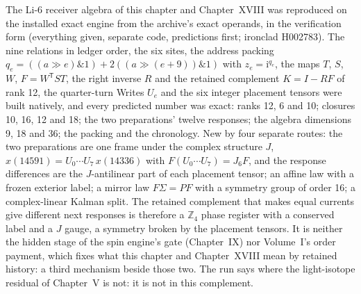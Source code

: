 The Li-6 receiver algebra of this chapter and Chapter~XVIII was reproduced on the installed exact engine from the archive's exact operands, in the verification form (everything given, separate code, predictions first; ironclad H002783).\cite{viili6run} The nine relations in ledger order, the six sites, the address packing $q_e=((a\gg e)\&1)+2((a\gg(e+9))\&1)$ with $z_e=\mathrm i^{q_e}$, the maps $T$, $S$, $W$, $F=W^{\mathsf T}ST$, the right inverse $R$ and the retained complement $K=I-RF$ of rank 12, the quarter-turn Writes $U_e$ and the six integer placement tensors were built natively, and every predicted number was exact: ranks 12, 6 and 10; closures 10, 16, 12 and 18; the two preparations' twelve responses; the algebra dimensions 9, 18 and 36; the packing and the chronology. New by four separate routes: the two preparations are one frame under the complex structure $J$, $x(14591)=U_0\cdots U_7\,x(14336)$ with $F(U_0\cdots U_7)=J_6F$, and the response differences are the $J$-antilinear part of each placement tensor; an affine law with a frozen exterior label; a mirror law $F\Sigma=PF$ with a symmetry group of order 16; a complex-linear Kalman split. The retained complement that makes equal currents give different next responses is therefore a $\mathbb Z_4$ phase register with a conserved label and a $J$ gauge, a symmetry broken by the placement tensors. It is neither the hidden stage of the spin engine's gate (Chapter~IX) nor Volume~I's order payment, which fixes what this chapter and Chapter~XVIII mean by retained history: a third mechanism beside those two. The run says where the light-isotope residual of Chapter~V is not: it is not in this complement.


